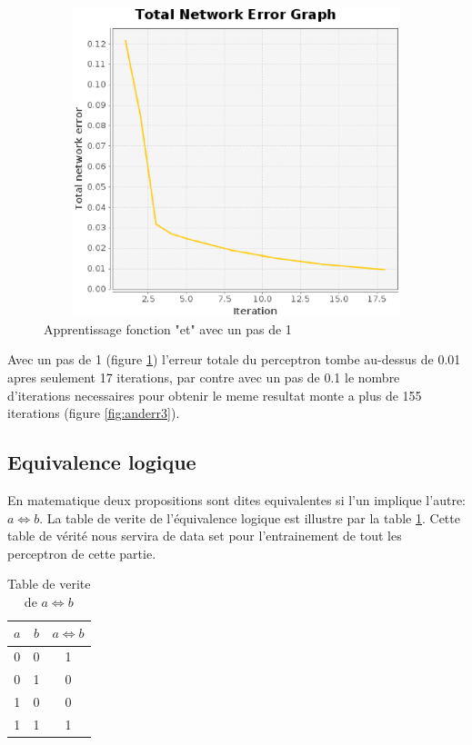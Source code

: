 \documentclass[twoside,openright,a4paper,11pt,french]{article}
\begin{document}
\begin{figure}[ht]
\centering
\includegraphics[width=12cm,height=9cm]{./pics/and_error4.eps}
\caption{Apprentissage fonction "et" avec un pas de 1}
\label{fig:anderr4}
\end{figure}

Avec un pas de 1 (figure \ref{fig:anderr4}) l'erreur totale du perceptron
tombe au-dessus de 0.01 apres seulement 17 iterations, par contre avec 
un pas de 0.1 le nombre d'iterations necessaires pour obtenir le meme
resultat monte a plus de 155 iterations (figure \ref{fig:anderr3}).

\subsection{Equivalence logique}
En matematique deux propositions sont dites equivalentes si l'un implique
l'autre: $a \Leftrightarrow b$. La table de verite de l'équivalence logique
est illustre par la table \ref{tab:eq}.
Cette table de vérité nous servira de data set pour l'entrainement de tout
les perceptron de cette partie.


\begin{table}[ht]
  \centering
  \begin{tabular}{| c | c | c |}
    \hline
    \textbf{$a$} & \textbf{$b$} & \textbf{$a \Leftrightarrow b$}\\
    \hline
    0 & 0  & 1 \\
    \hline
    0 & 1  & 0 \\
    \hline
    1 & 0  & 0 \\
    \hline
    1 & 1  & 1 \\
    \hline
  \end{tabular}
  \caption{Table de verite de $a \Leftrightarrow b$}
  \label{tab:eq}
\end{table}
\end{document}
